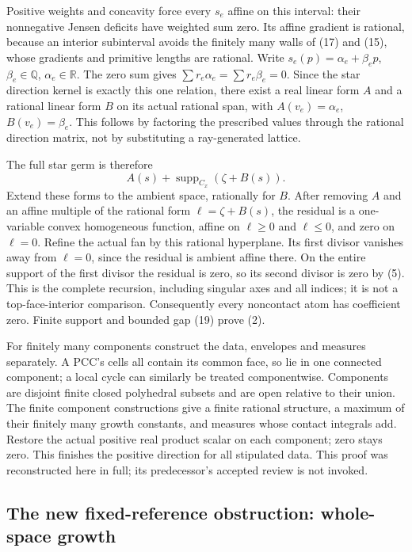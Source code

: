 \documentclass[
  11pt,
]{article}
\begin{document}
Positive weights and concavity force every \(s_e\) affine on this
interval: their nonnegative Jensen deficits have weighted sum zero. Its
affine gradient is rational, because an interior subinterval avoids the
finitely many walls of (17) and (15), whose gradients and primitive
lengths are rational. Write \(s_e(p)=\alpha_e+\beta_ep\),
\(\beta_e\in\mathbb{Q}\), \(\alpha_e\in\mathbb{R}\). The zero sum gives
\(\sum r_e\alpha_e=\sum r_e\beta_e=0\). Since the star direction kernel
is exactly this one relation, there exist a real linear form \(A\) and a
rational linear form \(B\) on its actual rational span, with
\(A(v_e)=\alpha_e\), \(B(v_e)=\beta_e\). This follows by factoring the
prescribed values through the rational direction matrix, not by
substituting a ray-generated lattice.

The full star germ is therefore \[
                              A(s)+\operatorname{supp}_{C_x}(\zeta+B(s)).\tag{27}
\] Extend these forms to the ambient space, rationally for \(B\). After
removing \(A\) and an affine multiple of the rational form
\(\ell=\zeta+B(s)\), the residual is a one-variable convex homogeneous
function, affine on \(\ell\geq0\) and \(\ell\leq0\), and zero on
\(\ell=0\). Refine the actual fan by this rational hyperplane. Its first
divisor vanishes away from \(\ell=0\), since the residual is ambient
affine there. On the entire support of the first divisor the residual is
zero, so its second divisor is zero by (5). This is the complete
recursion, including singular axes and all indices; it is not a
top-face-interior comparison. Consequently every noncontact atom has
coefficient zero. Finite support and bounded gap (19) prove (2).

For finitely many components construct the data, envelopes and measures
separately. A PCC's cells all contain its common face, so lie in one
connected component; a local cycle can similarly be treated
componentwise. Components are disjoint finite closed polyhedral subsets
and are open relative to their union. The finite component constructions
give a finite rational structure, a maximum of their finitely many
growth constants, and measures whose contact integrals add. Restore the
actual positive real product scalar on each component; zero stays zero.
This finishes the positive direction for all stipulated data. This proof
was reconstructed here in full; its predecessor's accepted review is not
invoked.

\subsection{The new fixed-reference obstruction: whole-space
growth}\label{the-new-fixed-reference-obstruction-whole-space-growth}
\end{document}
